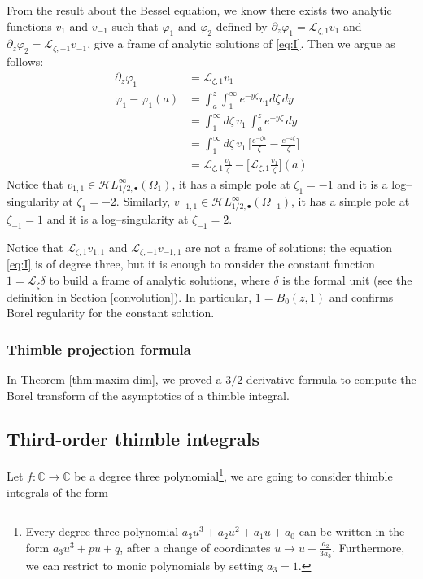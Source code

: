 \documentclass{article}
\newcommand{\singexp}[2]{\mathcal{H}L^\infty_{#1, #2}}
\newcommand{\singexpalg}[1]{\singexp{#1}{\bullet}}
\newcommand{\C}{\mathbb{C}}
\newcommand{\laplace}{\mathcal{L}}
\theoremstyle{definition}
\theoremstyle{plain}
\newenvironment{verify}{\color{ForestGreen}}{\color{black}}
\begin{document}
\begin{verify}
From the result about the Bessel equation, we know there exists two analytic functions $v_1$ and $v_{-1}$ such that $\varphi_1$ and $\varphi_2$ defined by $\partial_z\varphi_1=\laplace_{\zeta,1}v_1$ and $\partial_z\varphi_2=\laplace_{\zeta,-1}v_{-1}$, give a frame of analytic solutions of \eqref{eq:I}. Then we argue as follows:
\begin{align*}
    \partial_z\varphi_1&=\laplace_{\zeta,1}v_1\\
    \varphi_1-\varphi_1(a)&=\int_a^z\int_1^{\infty}e^{-y\zeta} v_1 d\zeta \, dy\\
    &=\int_1^{\infty}d\zeta\,  v_1 \, \int_a^ze^{-y\zeta}  \, dy\\
    &=\int_1^{\infty}d\zeta\,  v_1 \, \Big[\frac{e^{-\zeta a}}{\zeta}-\frac{e^{-z\zeta}}{\zeta}\Big]\\
    &=\laplace_{\zeta,1} \tfrac{v_1}{\zeta}-\Big[\laplace_{\zeta,1}\tfrac{v_1}{\zeta}\Big](a)
\end{align*}
\end{verify}
Notice that $v_{1,1}\in\singexpalg{1/2}(\Omega_1)$, it has a simple pole at $\zeta_1=-1$ and it is a log--singularity at $\zeta_1=-2$. Similarly, $v_{-1,1}\in\singexpalg{1/2}(\Omega_{-1})$, it has a simple pole at $\zeta_{-1}=1$ and it is a log--singularity at $\zeta_{-1}=2$.

Notice that $\laplace_{\zeta,1}v_{1,1}$ and $\laplace_{\zeta,-1}v_{-1,1}$ are not a frame of solutions; the equation \eqref{eq:I} is of degree three, but it is enough to consider the constant function $1=\laplace_\zeta \delta$ to build a frame of analytic solutions, where $\delta$ is the formal unit (see the definition in Section \ref{convolution}). In particular, $1=B_0(z,1)$ and confirms Borel regularity for the constant solution. 
%
\color{RoyalBlue}
\subsubsection{Thimble projection formula}
In Theorem \ref{thm:maxim-dim}, we proved a $3/2$-derivative formula to compute the Borel transform of the asymptotics of a thimble integral.
\color{black}
\subsection{Third-order thimble integrals}
Let $f\colon\C\to \C$ be a degree three polynomial\footnote{Every degree three polynomial $a_3 u^3+a_2 u^2+a_1 u+a_0$ can be written in the form $a_3u^3+pu+q$, after a change of coordinates $u\to u-\frac{a_2}{3 a_3}$. Furthermore, we can restrict to monic polynomials by setting $a_3=1$.}, we are going to consider thimble integrals of the form 
\end{document}
